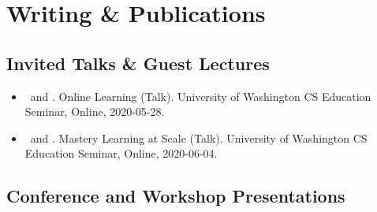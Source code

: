 \section{Writing \& Publications}
\vspace{6pt}

\subsection{Invited Talks \& Guest Lectures}

\vspace{5pt}

\begin{itemize}
    \setlength\itemsep{1em}

    \item{\me\ and \dan. Online Learning (Talk). University of Washington CS Education Seminar, Online, 2020-05-28.}
    
    \item{\me\ and \dan. Mastery Learning at Scale (Talk). University of Washington CS Education Seminar, Online, 2020-06-04.}
\end{itemize}

\subsection{Conference and Workshop Presentations}

\vspace{5pt}

